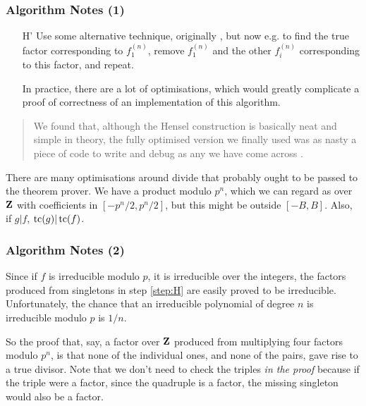 \documentclass[handout]{beamer}   %
\begin{document}
\begin{frame}[fragile]
\frametitle{Algorithm Notes (1)}
\begin{enumerate}[<+->]\item[H']\label{step:H'}Use some alternative technique, originally \cite{Lenstraetal1982}, but now e.g. \cite{Abbottetal2000a,Hartetal2011a} to find the true factor corresponding to $f_1^{(n)}$, remove $f_1^{(n)}$ and the other $f_i^{(n)}$ corresponding to this factor, and repeat.
\item[\dbend]In practice, there are a lot of optimisations, which would greatly complicate a proof of correctness of an implementation of this algorithm.
\end{enumerate}
\pause
\begin{quote}
We found that, although the Hensel construction is basically neat and simple in theory,
the fully optimised version we finally used was as nasty a piece of code to write and
debug as any we have come across \cite{MooreNorman1981}.
\end{quote}
\pause
There are many optimisations around {\color{red}divide} that probably {\color{red}ought} to be passed to the theorem prover. \pause We have a product modulo $p^n$, which we can regard as over ${\bf Z}$ with coefficients in $[-p^n/2,p^n/2]$, but this might be outside $[-B,B]$. \pause Also, if $g|f$, $\mathop{\rm tc}(g)|\mathop{\rm tc}(f)$.
\end{frame}
\begin{frame}[fragile]
\frametitle{Algorithm Notes (2)}
Since if $f$ is irreducible modulo $p$, it is irreducible over the integers, the factors produced from singletons in step \ref{step:H} are easily proved to be irreducible.  Unfortunately, the chance that an irreducible polynomial of degree $n$ is irreducible modulo $p$ is $1/n$.
\par\pause
So the proof that, say, a factor over ${\bf Z}$ produced from multiplying four factors modulo $p^n$, is that none of the individual ones, and none of the pairs, gave rise to a true divisor.
\pause
Note that we don't need to check the triples \emph{in the proof} because if the triple were a factor, since the quadruple is a factor, the missing singleton would also be a factor.
\end{frame}
\end{document}
